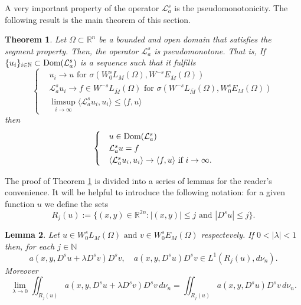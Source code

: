 \documentclass{amsart}
\def\Dom{\text{\normalfont Dom}}
\newcommand{\A}{\mathcal{L}_a^s}
\newcommand{\R}{{\mathbb R}}
\newcommand{\N}{{\mathbb N}}
\newtheorem{teo}{Theorem}[section]
\newtheorem{lema}[teo]{Lemma}
\theoremstyle{remark}
\theoremstyle{definition}
\numberwithin{equation}{section}
\begin{document}
A very important property of the operator $\A$ is the pseudomonotonicity. The following result is the main theorem of this section.
\begin{teo}\label{pseudo}
Let $\Omega\subset \R^n$ be a bounded and open domain that satisfies the segment property. Then, the operator $\A$ is pseudomonotone. That is, If $\{u_i\}_{i\in \N}\subset \Dom(\A)$ is a sequence such that it fulfills
\begin{equation}\label{seq.pseudo}
\begin{cases}	
&u_i\to u\text{ for }\sigma(W_0^sL_M(\Omega),W^{-s}E_{\bar{M}}(\Omega))\\
&\A u_i\to f\in W^{-s}L_{\bar{M}}(\Omega)\text{ for }\sigma(W^{-s}L_{\bar{M}}(\Omega),W_0^sE_M(\Omega))\\
&\limsup_{i\to \infty}\langle \A u_i,u_i\rangle\leq \langle f,u\rangle
\end{cases}
\end{equation}
then 
\begin{equation}\label{tesis.pseudo}
\begin{cases}
&u\in \Dom(\A)
\\
&\A u=f
\\
&\langle \A u_i,u_i\rangle\to  \langle f,u\rangle\text{ if }i\to \infty.
\end{cases}
\end{equation}
\end{teo}

The proof of Theorem \ref{pseudo} is divided into a series of lemmas for the reader's convenience. It will be helpful to introduce the following notation: for a given function $u$ we define the sets
$$
R_j(u):=\{(x,y)\in \R^{2n}\colon |(x,y)|\leq j \text{ and }|D^s u|\leq j \}.
$$

\begin{lema}\label{paralimite}
Let $u \in W_0^s L_M(\Omega) \text{ and } v \in W_0^s E_M(\Omega) $ respectevely. If $0<|\lambda|<1$ then, for each $j \in \N$
$$
a(x,y,D^su+\lambda D^s v)D^s v,\quad a(x,y,D^s u)D^s v\in L^1(R_j(u),d\nu_n).
$$
Moreover
$$
\lim_{\lambda \to 0}\iint_{R_j(u)} a(x,y,D^su+\lambda D^s v)D^sv \,d\nu_n=\iint_{R_j(u)} a(x,y,D^s u)D^s v\,d\nu_n. 
$$
\end{lema}
\end{document}
